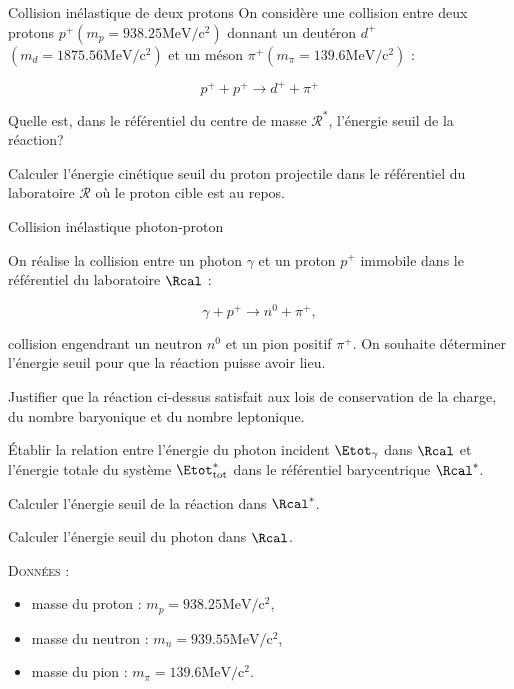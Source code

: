 \begin{exo}[PC][1][colle]{Collision inélastique de deux protons}
On considère une collision entre deux protons $p^{+}\left(m_{p}=938.25 \mathrm{MeV} / \mathrm{c}^{2}\right)$ donnant un deutéron $d^{+}$ $\left(m_{d}=1875.56 \mathrm{MeV} / \mathrm{c}^{2}\right)$ et un méson $\pi^{+}\left(m_{\pi}=139.6 \mathrm{MeV} / \mathrm{c}^{2}\right)$ :

$$
p^{+}+p^{+} \rightarrow d^{+}+\pi^{+}
$$

Quelle est, dans le référentiel du centre de masse $\mathcal{R}^{*}$, l'énergie seuil de la réaction?

Calculer l'énergie cinétique seuil du proton projectile dans le référentiel du laboratoire $\mathcal{R}$ où le proton cible est au repos.
\end{exo}


\begin{exo}[PC][3][TD]{Collision inélastique photon-proton}

On réalise la collision entre un photon $\gamma$ et un proton $p^+$ immobile dans le référentiel du laboratoire $\Rcal$ :

\begin{equation}
  \gamma+p^{+} \rightarrow n^0+\pi^{+ },
\end{equation}

collision engendrant un neutron $n^0$ et un pion positif $\pi^{+}$. On souhaite déterminer l'énergie seuil pour que la réaction puisse avoir lieu.

\begin{quest}
  \item Justifier que la réaction ci-dessus satisfait aux lois de conservation de la charge, du nombre baryonique et du nombre leptonique.
  \item Établir la relation entre l'énergie du photon incident $\Etot_{\gamma}$ dans $\Rcal$ et l'énergie totale du système $\Etot_{\rm tot}^*$ dans le référentiel barycentrique $\Rcal^{*}$.

  \item Calculer l'énergie seuil de la réaction dans $\Rcal^{*}$.

  \item Calculer l'énergie seuil du photon dans $\Rcal$.

\end{quest}


\textsc{Données} :
\begin{itemize}
  \item masse du proton : $m_{p}=938.25 \mathrm{MeV} / \mathrm{c}^{2}$,
  \item masse du neutron : $m_{n}=939.55 \mathrm{MeV} / \mathrm{c}^{2}$,
  \item masse du pion : $m_{\pi}=139.6 \mathrm{MeV} / \mathrm{c}^{2}$.
\end{itemize}

\end{exo}

